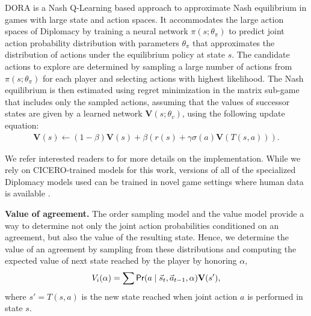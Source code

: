 DORA is a Nash Q-Learning based approach to approximate Nash equilibrium in games with large state and action spaces.
It accommodates the large action spaces of Diplomacy by training a neural network $\pi(s; \theta_\pi)$ to predict joint action probability distribution with parameters $\theta_\pi$ that approximates the distribution of actions under the equilibrium policy at state $s$.
The candidate actions to explore are determined by sampling a large number of actions from $\pi(s; \theta_\pi)$ for each player and selecting actions with highest likelihood.
The Nash equilibrium is then estimated using regret minimization \citep{foster1999regret} in the matrix sub-game that includes only the sampled actions, assuming that the values of successor states are given by a learned network $\mathbf{V}(s; \theta_v)$, using the following update equation: 
% 
\begin{align*}
	\mathbf{V}(s) \gets (1 - \beta) \mathbf{V}(s) + \beta(r(s) + \gamma \sigma(a) \mathbf{V}(T(s, a))).
\end{align*}




We refer interested readers to \citep{bakhtin2021no} for more details on the implementation. While we rely on CICERO-trained models for this work, versions of all of the specialized Diplomacy models used can be trained in novel game settings where human data is available \citep{bakhtin2021no}.

\textbf{Value of agreement.} 
The order sampling model and the value model provide a way to determine not only the joint action probabilities conditioned on an agreement, but also the value of the resulting state. 
Hence, we determine the value of an agreement by sampling from these distributions and computing the expected value of next state reached by the player by honoring $\alpha$,
\begin{align} \label{eq:value-of-agreement}
	V_i(\alpha) = \sum \mathsf{Pr}(a \mid \vec{s}_t, \vec{a}_{t-1}, \alpha)  \mathbf{V}(s'),
\end{align}
where $s' = T(s, a)$ is the new state reached when joint action $a$ is performed in state $s$. 


